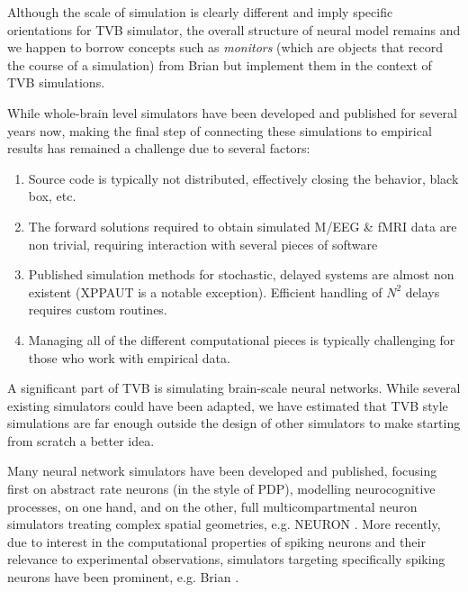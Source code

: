 Although the scale of simulation is clearly different and imply specific
orientations for TVB simulator, the overall structure of neural model remains
and we happen to borrow concepts such as \emph{monitors} (which are objects that
record the course of a simulation) from Brian but
implement them in the context of TVB simulations.


While whole-brain level simulators have been developed and published for
several years now, making the final step of connecting these simulations to
empirical results has remained a challenge due to several factors:

\begin{enumerate}

	\item Source code is typically not distributed, effectively closing
        the behavior, black box, etc. 

	\item The forward solutions required to obtain simulated M/EEG \& fMRI
	data are non trivial, requiring interaction with several pieces of software

	\item Published simulation methods for stochastic, delayed systems 
		are almost non existent (XPPAUT \cite{XPPAUT} is a notable exception).
		Efficient handling of $N^2$ delays requires custom routines.

	\item Managing all of the different computational pieces is typically
	challenging for those who work with empirical data.

\end{enumerate}

A significant part of TVB is simulating brain-scale neural networks. While
several existing simulators could have been adapted, we have estimated that
TVB style simulations are far enough outside the design of other simulators to
make starting from scratch a better idea.

Many neural network simulators have been developed and published, focusing
first on abstract rate neurons (in the style of PDP), modelling neurocognitive
processes, on one hand, and on the other, full multicompartmental neuron
simulators treating complex spatial geometries, e.g. NEURON \cite{Hines_2001}.
More recently, due to interest in the computational properties of spiking 
neurons and their relevance to experimental observations, simulators targeting
specifically spiking neurons have been prominent, e.g. Brian 
\cite{Goodman_2009}.

